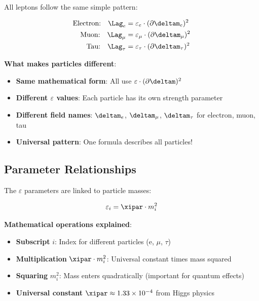 	All leptons follow the same simple pattern:
	
	\begin{align}
		\text{Electron:} \quad \Lag_e &= \varepsilon_e \cdot (\partial \deltam_e)^2 \\
		\text{Muon:} \quad \Lag_{\mu} &= \varepsilon_{\mu} \cdot (\partial \deltam_{\mu})^2 \\
		\text{Tau:} \quad \Lag_{\tau} &= \varepsilon_{\tau} \cdot (\partial \deltam_{\tau})^2
	\end{align}
	
	\textbf{What makes particles different}:
	\begin{itemize}
		\item \textbf{Same mathematical form}: All use $\varepsilon \cdot (\partial \deltam)^2$
		\item \textbf{Different $\varepsilon$ values}: Each particle has its own strength parameter
		\item \textbf{Different field names}: $\deltam_e$, $\deltam_{\mu}$, $\deltam_{\tau}$ for electron, muon, tau
		\item \textbf{Universal pattern}: One formula describes all particles!
	\end{itemize}
	
	\subsection{Parameter Relationships}
	
	The $\varepsilon$ parameters are linked to particle masses:
	
	\begin{equation}
		\varepsilon_i = \xipar \cdot m_i^2
		\label{eq:epsilon_mass_relation}
	\end{equation}
	
	\textbf{Mathematical operations explained}:
	\begin{itemize}
		\item \textbf{Subscript} $i$: Index for different particles (e, $\mu$, $\tau$)
		\item \textbf{Multiplication} $\xipar \cdot m_i^2$: Universal constant times mass squared
		\item \textbf{Squaring} $m_i^2$: Mass enters quadratically (important for quantum effects)
		\item \textbf{Universal constant} $\xipar \approx 1.33 \times 10^{-4}$ from Higgs physics
	\end{itemize}
	
